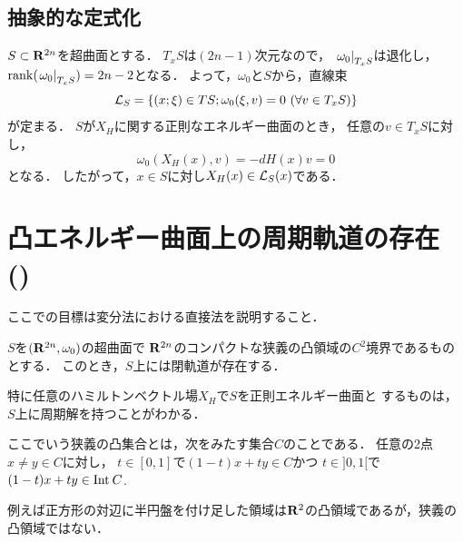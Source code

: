 \subsection*{抽象的な定式化}
\(S\subset \rr^{2n}\)を超曲面とする．
\(T_xS\)は\((2n-1)\)次元なので，
\(\mres[\omega_{0}]{T_{x}S}\)は退化し，
\(\rank(\mres[\omega_{0}]{T_{x}S})=2n-2\)となる．
よって，\(\omega_0\)と\(S\)から，直線束
\[
    \cL_S
    =
    \left\{
        (x;\xi)\in TS;
        \omega_0(\xi,v)=0\ (\forall v\in T_xS)
    \right\}
\]が定まる．
\(S\)が\(X_H\)に関する正則なエネルギー曲面のとき，
任意の\(v\in T_xS\)に対し，
\[
    \omega_0(X_{H}(x),v)=-dH(x)v=0
\]
となる．
したがって，\(x\in S\)に対し\(X_H(x)\in\cL_S(x)\)である．


\section{凸エネルギー曲面上の周期軌道の存在 (\cite[\S1.5]{HZ94})}

ここでの目標は変分法における直接法を説明すること．
\begin{leftbar}
\begin{THM}[{\cite[Thm 5]{HZ94}}]
    \(S\)を\((\rr^{2n},\omega_0)\)の超曲面で
    \(\rr^{2n}\)のコンパクトな狭義の凸領域の\(C^2\)境界であるものとする．
    このとき，\(S\)上には閉軌道が存在する．
\end{THM}
\end{leftbar}

特に任意のハミルトンベクトル場\(X_H\)で\(S\)を正則エネルギー曲面と
するものは，\(S\)上に周期解を持つことがわかる．
\begin{CMT}
    ここでいう狭義の凸集合とは，次をみたす集合\(C\)のことである．
    任意の2点\(x\ne y\in C\)に対し，
    \(t\in[0,1]\)で\((1-t)x+ty\in C\)かつ
    \(t\in{]0,1[}\)で\((1-t)x+ty\in\Int[]C\).

    例えば正方形の対辺に半円盤を付け足した領域は\(\rr^2\)の凸領域であるが，狭義の凸領域ではない．
\end{CMT}

